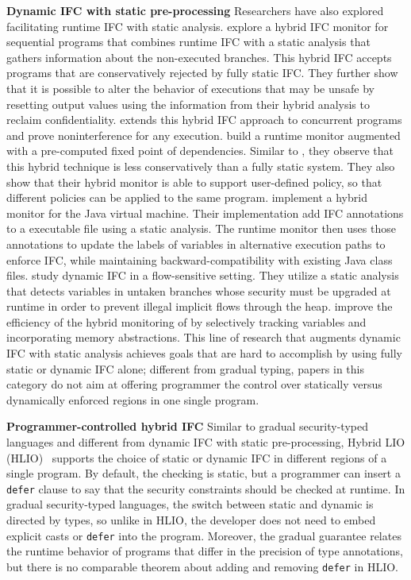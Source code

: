 \textbf{Dynamic IFC with static pre-processing} Researchers have also explored
facilitating runtime IFC with static analysis. \textcite{le2005monitoring}
explore a hybrid IFC monitor for sequential programs that combines runtime IFC
with a static analysis that gathers information about the non-executed branches.
This hybrid IFC accepts programs that are conservatively rejected by fully
static IFC. They further show that it is possible to alter the behavior of
executions that may be unsafe by resetting output values using the information
from their hybrid analysis to reclaim confidentiality.
\textcite{le2007automaton} extends this hybrid IFC approach to concurrent
programs and prove noninterference for any execution. \textcite{Shroff:2007tg}
build a runtime monitor augmented with a pre-computed fixed point of
dependencies. Similar to \textcite{le2005monitoring}, they observe that this
hybrid technique is less conservatively than a fully static system. They also
show that their hybrid monitor is able to support user-defined policy, so that
different policies can be applied to the same program. \textcite{Chandra:2007we}
implement a hybrid monitor for the Java virtual machine. Their implementation
add IFC annotations to a executable file using a static analysis. The runtime
monitor then uses those annotations to update the labels of variables in
alternative execution paths to enforce IFC, while maintaining
backward-compatibility with existing Java class files.
\textcite{russo2010dynamic} study dynamic IFC in a flow-sensitive setting. They
utilize a static analysis that detects variables in untaken branches whose
security must be upgraded at runtime in order to prevent illegal implicit flows
through the heap. \textcite{moore2011static} improve the efficiency of the
hybrid monitoring of \textcite{russo2010dynamic} by selectively tracking
variables and incorporating memory abstractions. This line of research that
augments dynamic IFC with static analysis achieves goals that are hard to
accomplish by using fully static or dynamic IFC alone; different from gradual
typing, papers in this category do not aim at offering programmer the control
over statically versus dynamically enforced regions in one single program.

\textbf{Programmer-controlled hybrid IFC} Similar to gradual security-typed
languages and different from dynamic IFC with static pre-processing, Hybrid LIO
(HLIO)~\cite{Buiras:2015aa} supports the choice of static or dynamic IFC in
different regions of a single program. By default, the checking is static, but a
programmer can insert a \texttt{defer} clause to say that the security
constraints should be checked at runtime. In gradual security-typed languages,
the switch between static and dynamic is directed by types, so unlike in HLIO,
the developer does not need to embed explicit casts or \texttt{defer} into the
program. Moreover, the gradual guarantee relates the runtime behavior of
programs that differ in the precision of type annotations, but there is no
comparable theorem about adding and removing \texttt{defer} in HLIO.

